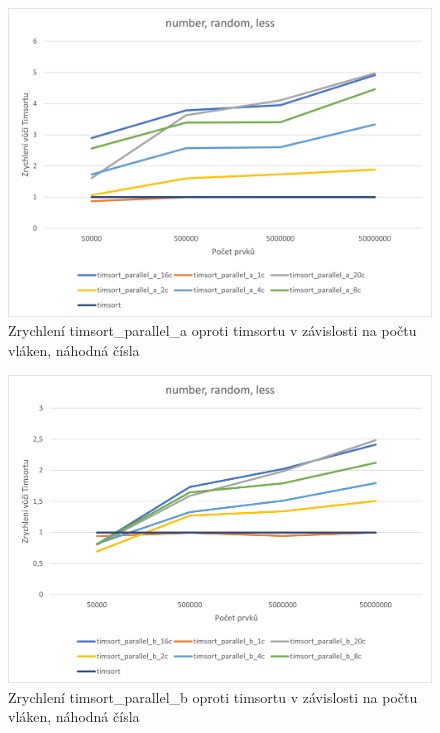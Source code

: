 \documentclass[thesis=B,czech]{FITthesis}[2019/12/23]
\begin{document}
\begin{figure}[htbp]\centering
	\includegraphics[width=13cm]{obrazky/graf22.png}
	\caption[Zrychlení timsort\_parallel\_a oproti timsortu v závislosti na počtu vláken, náhodná čísla]{Zrychlení timsort\_parallel\_a oproti timsortu v závislosti na počtu vláken, náhodná čísla}\label{fig:graf22}
\end{figure}

\begin{figure}[htbp]\centering
	\includegraphics[width=13cm]{obrazky/graf23.png}
	\caption[Zrychlení timsort\_parallel\_b oproti timsortu v závislosti na počtu vláken, náhodná čísla]{Zrychlení timsort\_parallel\_b oproti timsortu v závislosti na počtu vláken, náhodná čísla}\label{fig:graf23}
\end{figure}
\end{document}
